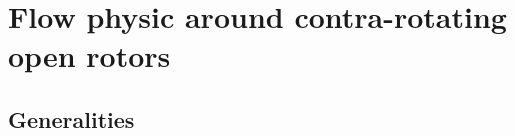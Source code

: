 \chapter{Flow physic around contra-rotating open rotors}
\label{cha:cror}

\chabstract{}

\minitoc
\newpage

\section{Generalities}
\label{sec:cror_generalities}


\chconclu{}
